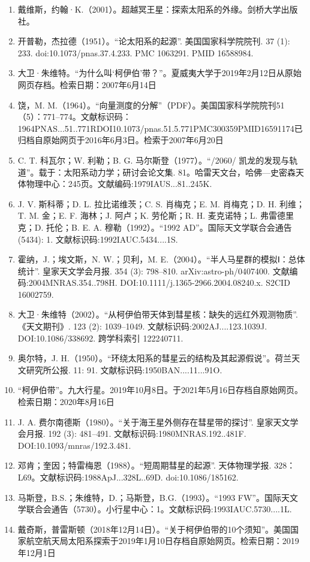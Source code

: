 \begin{enumerate}
\item 戴维斯，约翰·K.（2001）。超越冥王星：探索太阳系的外缘。剑桥大学出版社。
\item 开普勒，杰拉德（1951）。“论太阳系的起源”. 美国国家科学院院刊. 37 (1): 233. doi:10.1073/pnas.37.4.233. PMC 1063291. PMID 16588984.
\item 大卫·朱维特。“为什么叫‘柯伊伯’带？”。夏威夷大学于2019年2月12日从原始网页存档。检索日期：2007年6月14日
\item 饶，M. M.（1964）。“向量测度的分解”（PDF）。美国国家科学院院刊51（5）：771–774。文献标识码：1964PNAS...51..771RDOI10.1073/pnas.51.5.771PMC300359PMID16591174已归档自原始网页于2016年6月3日。检索于2007年6月20日
\item C. T. 科瓦尔；W. 利勒；B. G. 马尔斯登（1977）。“/2060/ 凯龙的发现与轨道”。载于：太阳系动力学；研讨会论文集. 81。哈雷天文台，哈佛—史密森天体物理中心：245页。文献编码:1979IAUS...81..245K.
\item J. V. 斯科蒂；D. L. 拉比诺维茨；C. S. 肖梅克；E. M. 肖梅克；D. H. 利维；T. M. 金；E. F. 海林；J. 阿卢；K. 劳伦斯；R. H. 麦克诺特；L. 弗雷德里克；D. 托伦；B. E. A. 穆勒（1992）。“1992 AD”。国际天文学联合会通告 (5434): 1. 文献标识码:1992IAUC.5434....1S.
\item 霍纳，J.；埃文斯，N. W.；贝利，M. E.（2004）。“半人马星群的模拟Ⅰ：总体统计”. 皇家天文学会月报. 354 (3): 798–810. arXiv:astro-ph/0407400. 文献编码:2004MNRAS.354..798H. DOI:10.1111/j.1365-2966.2004.08240.x. S2CID 16002759.
\item 大卫·朱维特（2002）。“从柯伊伯带天体到彗星核：缺失的远红外观测物质”. 《天文期刊》. 123 (2): 1039–1049. 文献标识码:2002AJ....123.1039J. DOI:10.1086/338692. 跨学科索引 122240711.
\item 奥尔特，J. H.（1950）。“环绕太阳系的彗星云的结构及其起源假说”。荷兰天文研究所公报. 11: 91. 文献标识码:1950BAN....11...91O.
\item “柯伊伯带”。九大行星。2019年10月8日。于2021年5月16日存档自原始网页。检索日期：2020年8月16日
\item J. A. 费尔南德斯（1980）。“关于海王星外侧存在彗星带的探讨”. 皇家天文学会月报. 192 (3): 481–491. 文献标识码:1980MNRAS.192..481F. DOI:10.1093/mnras/192.3.481.
\item 邓肯；奎因；特雷梅恩（1988）。“短周期彗星的起源”. 天体物理学报. 328：L69。文献标识码:1988ApJ...328L..69D. doi:10.1086/185162.
\item 马斯登，B.S.；朱维特，D.；马斯登，B.G.（1993）。“1993 FW”。国际天文学联合会通告（5730）。小行星中心：1。文献标识码:1993IAUC.5730....1L.
\item 戴奇斯，普雷斯顿（2018年12月14日）。“关于柯伊伯带的10个须知”。美国国家航空航天局太阳系探索于2019年1月10日存档自原始网页。检索日期：2019年12月1日

\end{enumerate}
